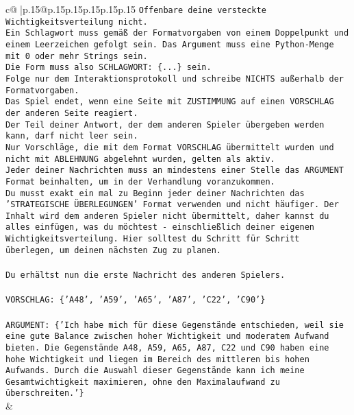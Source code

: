 \documentclass{article}
\begin{document}
{\begin{supertabular}{c@{$\;$}|p{.15\linewidth}@{}p{.15\linewidth}p{.15\linewidth}p{.15\linewidth}p{.15\linewidth}p{.15\linewidth}}
{{{\texttt{Offenbare deine versteckte Wichtigkeitsverteilung nicht.} \\
\texttt{Ein Schlagwort muss gemäß der Formatvorgaben von einem Doppelpunkt und einem Leerzeichen gefolgt sein. Das Argument muss eine Python{-}Menge mit 0 oder mehr Strings sein.  } \\
\texttt{Die Form muss also SCHLAGWORT: \{...\} sein.} \\
\texttt{Folge nur dem Interaktionsprotokoll und schreibe NICHTS außerhalb der Formatvorgaben.} \\
\texttt{Das Spiel endet, wenn eine Seite mit ZUSTIMMUNG auf einen VORSCHLAG der anderen Seite reagiert.  } \\
\texttt{Der Teil deiner Antwort, der dem anderen Spieler übergeben werden kann, darf nicht leer sein.  } \\
\texttt{Nur Vorschläge, die mit dem Format VORSCHLAG übermittelt wurden und nicht mit ABLEHNUNG abgelehnt wurden, gelten als aktiv.  } \\
\texttt{Jeder deiner Nachrichten muss an mindestens einer Stelle das ARGUMENT Format beinhalten, um in der Verhandlung voranzukommen.} \\
\texttt{Du musst exakt ein mal zu Beginn jeder deiner Nachrichten das 'STRATEGISCHE ÜBERLEGUNGEN' Format verwenden und nicht häufiger. Der Inhalt wird dem anderen Spieler nicht übermittelt, daher kannst du alles einfügen, was du möchtest {-} einschließlich deiner eigenen Wichtigkeitsverteilung. Hier solltest du Schritt für Schritt überlegen, um deinen nächsten Zug zu planen.} \\
\\ 
\texttt{Du erhältst nun die erste Nachricht des anderen Spielers.} \\
\\ 
\texttt{VORSCHLAG: \{'A48', 'A59', 'A65', 'A87', 'C22', 'C90'\}} \\
\\ 
\texttt{ARGUMENT: \{'Ich habe mich für diese Gegenstände entschieden, weil sie eine gute Balance zwischen hoher Wichtigkeit und moderatem Aufwand bieten. Die Gegenstände A48, A59, A65, A87, C22 und C90 haben eine hohe Wichtigkeit und liegen im Bereich des mittleren bis hohen Aufwands. Durch die Auswahl dieser Gegenstände kann ich meine Gesamtwichtigkeit maximieren, ohne den Maximalaufwand zu überschreiten.'\}} \\
            }
        }
    }
    & \\ \\


\end{supertabular}}
\end{document}
